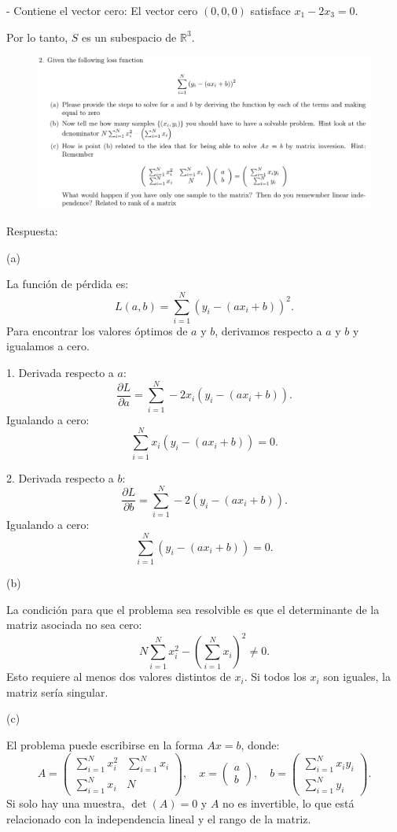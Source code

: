 \documentclass[12pt]{report}
\begin{document}
- Contiene el vector cero: El vector cero \( (0, 0, 0) \) satisface \( x_1 - 2x_3 = 0 \).

Por lo tanto, \( S \) es un subespacio de \( \mathbb{R}^3 \).

\begin{figure}[H]
	\centering
	\includegraphics[width=1\textwidth]{inciso2}
\end{figure}
Respuesta:


(a) 

La función de pérdida es:
\[
L(a, b) = \sum_{i=1}^{N} \left( y_i - (ax_i + b) \right)^2.
\]
Para encontrar los valores óptimos de \( a \) y \( b \), derivamos respecto a \( a \) y \( b \) y igualamos a cero.

1. Derivada respecto a \( a \):
\[
\frac{\partial L}{\partial a} = \sum_{i=1}^{N} -2x_i \left( y_i - (ax_i + b) \right).
\]
Igualando a cero:
\[
\sum_{i=1}^{N} x_i \left( y_i - (ax_i + b) \right) = 0.
\]

2. Derivada respecto a \( b \):
\[
\frac{\partial L}{\partial b} = \sum_{i=1}^{N} -2 \left( y_i - (ax_i + b) \right).
\]
Igualando a cero:
\[
\sum_{i=1}^{N} \left( y_i - (ax_i + b) \right) = 0.
\]

(b) 

La condición para que el problema sea resolvible es que el determinante de la matriz asociada no sea cero:
\[
N \sum_{i=1}^{N} x_i^2 - \left( \sum_{i=1}^{N} x_i \right)^2 \neq 0.
\]
Esto requiere al menos dos valores distintos de \( x_i \). Si todos los \( x_i \) son iguales, la matriz sería singular.

(c) 

El problema puede escribirse en la forma \( Ax = b \), donde:
\[
A = \begin{pmatrix}
	\sum_{i=1}^{N} x_i^2 & \sum_{i=1}^{N} x_i \\
	\sum_{i=1}^{N} x_i & N
\end{pmatrix},
\quad
x = \begin{pmatrix}
	a \\
	b
\end{pmatrix},
\quad
b = \begin{pmatrix}
	\sum_{i=1}^{N} x_i y_i \\
	\sum_{i=1}^{N} y_i
\end{pmatrix}.
\]
Si solo hay una muestra, \( \det(A) = 0 \) y \( A \) no es invertible, lo que está relacionado con la independencia lineal y el rango de la matriz.
\end{document}
